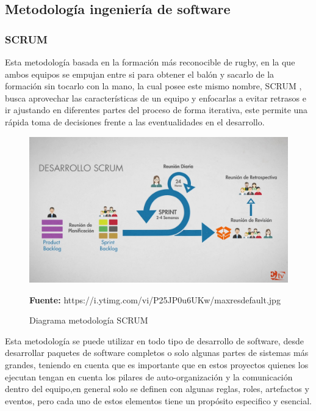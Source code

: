\subsection{Metodología ingeniería de software}
\subsubsection{SCRUM}

Esta metodología basada en la formación más reconocible de rugby, en la que ambos equipos se empujan entre si para obtener el balón y sacarlo de la formación sin tocarlo con la mano, la cual posee este mismo nombre, SCRUM \parencite{AlexanderMenzinskyGertrudisLopez2016ScrumManage}, busca aprovechar las características de un equipo y enfocarlas a evitar retrasos  e ir ajustando en diferentes partes del proceso de forma iterativa, este permite una rápida toma de decisiones frente a las eventualidades en el desarrollo.

\begin{figure}[H]
    \centering
    \includegraphics[width=1\textwidth]{Anexos/LATEX/chapters/images/maxresdefault.jpg}
    \caption{Diagrama metodología SCRUM}
    \small{\textbf{Fuente:} https://i.ytimg.com/vi/P25JP0u6UKw/maxresdefault.jpg}
    \label{SCRUM}
\end{figure}

Esta metodología se puede utilizar en todo tipo de desarrollo de software, desde desarrollar paquetes de software completos o solo algunas partes de sistemas más grandes, teniendo en cuenta que es importante que en estos proyectos quienes los ejecutan tengan en cuenta los pilares de auto-organización y la comunicación dentro del equipo,en general solo se definen con algunas reglas, roles, artefactos y eventos, pero cada uno de estos elementos tiene un propósito especifico y esencial.

